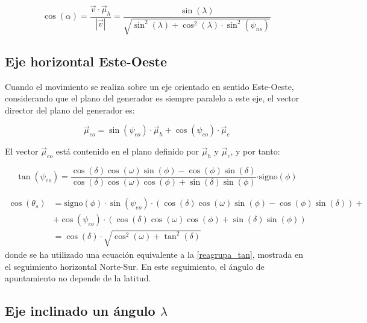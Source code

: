 \begin{equation}
\cos(\alpha)=\frac{\vec{v}\cdot\vec{\mu}_{h}}{\left|\vec{v}\right|}=\frac{\sin(\lambda)}{\sqrt{\sin^{2}(\lambda)+\cos^{2}(\lambda)\cdot\sin^{2}(\psi_{ns})}}\label{eq:cosAlfaNSInclinado}\end{equation}



\subsection{Eje horizontal Este-Oeste}

Cuando el movimiento se realiza sobre un eje orientado en sentido
Este-Oeste, considerando que el plano del generador es siempre paralelo
a este eje, el vector director del plano del generador es:

\begin{equation}
\vec{\mu}_{eo}=\sin(\psi_{eo})\cdot\vec{\mu}_{h}+\cos(\psi_{eo})\cdot\vec{\mu}_{c}\end{equation}

El vector $\vec{\mu}_{eo}$ está contenido en el plano definido por
$\vec{\mu}_{h}$ y $\vec{\mu}_{c}$, y por tanto:

\begin{equation}
\tan(\psi_{eo})=\frac{\cos(\delta)\cos(\omega)\sin(\phi)-\cos(\phi)\sin(\delta)}{\cos(\delta)\cos(\omega)\cos(\phi)+\sin(\delta)\sin(\phi)}\mathrm{\cdot signo}(\phi)\end{equation}


\begin{align}
\cos(\theta_{s}) & =\mathrm{signo}(\phi)\cdot\sin(\psi_{eo})\cdot\left(\cos(\delta)\cos(\omega)\sin(\phi)-\cos(\phi)\sin(\delta)\right)+\nonumber \\
 & +\cos(\psi_{eo})\cdot(\cos(\delta)\cos(\omega)\cos(\phi)+\sin(\delta)\sin(\phi))\nonumber \\
 & =\cos(\delta)\cdot\sqrt{\cos^{2}(\omega)+\tan^{2}(\delta)}\label{eq:cosThetaEO}\end{align}
donde se ha utilizado una ecuación equivalente a la \eqref{reagrupa_tan},
mostrada en el seguimiento horizontal Norte-Sur. En este seguimiento,
el ángulo de apuntamiento no depende de la latitud.


\subsection{Eje inclinado un ángulo $\lambda$}

